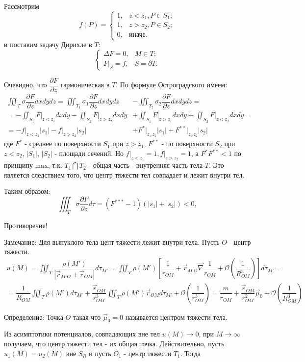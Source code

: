 \documentclass{article}
\begin{document}
Рассмотрим 
\[
f(P) = 
	\begin{cases}
	1, & z < z_1, P \in S_1;\\
	1, & z > z_2, P \in S_2;\\
	0, & \text{иначе}.
	\end{cases}
\]
и поставим задачу Дирихле в $T$:
\[
\begin{cases}
\Delta F = 0, & M \in T;\\
F \bigg|_S = f, & S = \partial T.
\end{cases}
\]

Очевидно, что $\dfrac{\partial F}{\partial z}$ гармоническая в $T$. По формуле Остроградского имеем:
\[
\begin{split}
\iiint_T \sigma \dfrac{\partial F}{\partial z} dx dy dz = 
\iiint_{T_1} \sigma_1 \dfrac{\partial F}{\partial z} dx dy dz &- 
\iiint_{T_2} \sigma_2 \dfrac{\partial F}{\partial z} dx dy dz=\\
= - \iint_{S_1} F \bigg|_{z<z_1} dx dy - \iint_{S_2} F \bigg|_{z>z_2} dx dy &+ \iint_{S_1} F \bigg|_{z>z_1} dx dy + \iint_{S_2} F \bigg|_{z<z_2} dx dy = \\
= -f \bigg|_{z<z_1}|s_1| - f \bigg|_{z > z_2} |s_2| &+ F^* \bigg|_{z_>z_1} |s_1| + F^{**} \bigg|_{z_>z_2} |s_2|
\end{split}
\]
где $F^*$ - среднее по поверхности $S_1$ при $z > z_1$, $F^{**}$ - по поверхности $S_2$ при $z <z_2$, $|S_1|$, $|S_2|$ - площади сечений. Но $f \bigg|_{z<z_1} = 1, f \bigg|_{z>z_2} = 1$, а $F^* F^{**} < 1$ по принципу max, т.к. $T_1 \bigcap T_2$ - общая часть - внутренняя часть тела $T$. Это является следствием того, что центр тяжести тел совпадает и лежит внутри тел.

Таким образом:
\[
\iiint_T \sigma \dfrac{\partial F}{\partial z} d \tau = (F^{***} -1)(|s_1| + |s_2|) < 0,
\]

Противоречие!


Замечание: Для выпуклого тела цент тяжести лежит внутри тела. Пусть $O$ - центр тяжести.
\[
\begin{split}
u(M) = \iiint_T \dfrac{\rho(M')}{| \overrightarrow{r}_{M'O} + \overrightarrow{r}_{OM} |} d \tau_{M'} = \iiint_T \rho(M') [ \dfrac{1}{r_{OM}} + \overrightarrow{r}_{M'O} \overrightarrow{\nabla} \dfrac{1}{r_{OM}} + \mathcal{O} (\dfrac{1}{R_{OM}^3})] d\tau_{M'} = \\
=\dfrac{1}{R_{OM}} \iiint_T \rho(M') d \tau_{M'} + \dfrac{\overrightarrow{r}_{OM}}{r_{OM}^3} \iiint_T \rho(M') \overrightarrow{r}_{OM} d \tau_{M'} + \mathcal{O} (\dfrac{1}{r_{OM}^3}) = \dfrac{m}{r_{OM}} + \dfrac{\overrightarrow{r}_{OM}}{r_{OM}^2} \overrightarrow{\mu}_0 + \mathcal{O} (\dfrac{1}{R_{OM}^3})
\end{split}
\]

Определение: Точка $O$ такая что $\overrightarrow{\mu}_0 = 0$ называется центром тяжести тела.

Из асимптотики  потенциалов, совпадающих вне тел $u(M) \to 0$, при $M \to \infty$ получаем, что центр тяжести тел - их общая точка. Действительно, пусть $u_1(M) = u_2(M)$ вне $S_R$ и пусть $O_1$ - центр тяжести $T_1$. Тогда
 
\end{document}
